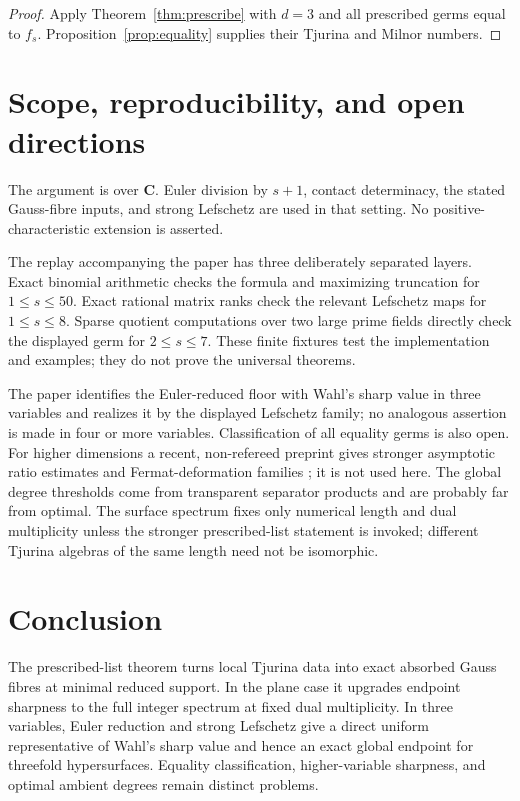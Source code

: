 \documentclass[11pt]{article}
\theoremstyle{remark}
\begin{document}
\begin{proof}
Apply Theorem~\ref{thm:prescribe} with \(d=3\) and all prescribed
germs equal to \(f_s\).  Proposition~\ref{prop:equality} supplies their
Tjurina and Milnor numbers.
\end{proof}

\section{Scope, reproducibility, and open directions}

The argument is over \(\mathbf C\).  Euler division by \(s+1\), contact
determinacy, the stated Gauss-fibre inputs, and strong Lefschetz are used in
that setting.  No positive-characteristic extension is asserted.

The replay accompanying the paper has three deliberately separated layers.
Exact binomial arithmetic checks the formula and maximizing truncation for
\(1\le s\le50\).  Exact rational matrix ranks check the relevant Lefschetz
maps for \(1\le s\le8\).  Sparse quotient computations over two large prime
fields directly check the displayed germ for \(2\le s\le7\).  These finite
fixtures test the implementation and examples; they do not prove the
universal theorems.

The paper identifies the Euler-reduced floor with Wahl's sharp value in
three variables and realizes it by the displayed Lefschetz family; no
analogous assertion is made in four or more variables.  Classification of
all equality germs is also open.
For higher dimensions a recent, non-refereed preprint gives stronger
asymptotic ratio estimates and Fermat-deformation families
\cite{MaZuo2026}; it is not used here.
The global degree thresholds come from transparent separator products and
are probably far from optimal.  The surface spectrum fixes only numerical
length and dual multiplicity unless the stronger prescribed-list statement
is invoked; different Tjurina algebras of the same length need not be
isomorphic.

\section{Conclusion}

The prescribed-list theorem turns local Tjurina data into exact absorbed
Gauss fibres at minimal reduced support.  In the plane case it upgrades
endpoint sharpness to the full integer spectrum at fixed dual multiplicity.
In three variables, Euler reduction and strong Lefschetz give a direct
uniform representative of Wahl's sharp value and hence an exact global
endpoint for threefold hypersurfaces.  Equality classification,
higher-variable sharpness, and optimal ambient degrees remain distinct
problems.
\end{document}
